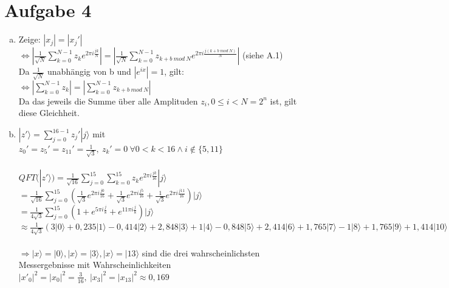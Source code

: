 \documentclass[a4paper]{scrartcl}
\begin{document}
\newpage
\section*{Aufgabe 4}
\begin{enumerate}[a)]
\item Zeige: $|x_j|=|x_j'|$\\
$\Leftrightarrow |\frac{1}{\sqrt{N}}\sum_{k=0}^{N-1}z_k e^{2\pi i \frac{jk}{N}}| = |\frac{1}{\sqrt{N}}\sum_{k=0}^{N-1}z_{k+b~mod~N} e^{2\pi i \frac{j(k+b~mod~N)}{N}}|$ (siehe A.1)\\
Da $\frac{1}{\sqrt{N}}$ unabhängig von b und $|e^{ix}|=1$, gilt:\\
$\Leftrightarrow |\sum_{k=0}^{N-1}z_k| = |\sum_{k=0}^{N-1}z_{k+b~mod~N}|$\\
Da das jeweils die Summe über alle Amplituden $z_i, 0\leq i < N = 2^n$ ist, gilt diese Gleichheit.

\item $|z'\rangle = \sum_{j=0}^{16-1} z_j' |j\rangle$ mit $z_0'=z_5'=z_{11}'=\frac{1}{\sqrt{3}},~z_k'=0~\forall 0<k<16 \wedge i\notin \{5,11\}$\\\\
$QFT(|z'\rangle) =\frac{1}{\sqrt{16}}\sum_{j=0}^{15}\sum_{k=0}^{15}z_k e^{2\pi i \frac{jk}{16}} |j\rangle$\\
$=\frac{1}{\sqrt{16}}\sum_{j=0}^{15} (\frac{1}{\sqrt{3}} e^{2\pi i \frac{j 0}{16}} + \frac{1}{\sqrt{3}} e^{2\pi i \frac{j 5}{16}} + \frac{1}{\sqrt{3}} e^{2\pi i \frac{j 11}{16}}) |j\rangle$\\
$=\frac{1}{4\sqrt{3}}\sum_{j=0}^{15} (1 + e^{5\pi i \frac{j}{8}} + e^{11\pi i \frac{j}{8}}) |j\rangle$\\
$\approx \frac{1}{4\sqrt{3}} (3 |0\rangle + 0,235 |1\rangle - 0,414 |2\rangle + 2,848|3\rangle + 1|4\rangle - 0,848|5\rangle + 2,414|6\rangle + 1,765|7\rangle - 1|8\rangle + 1,765|9\rangle + 1,414|10\rangle - 0,848|11\rangle + 1|12\rangle + 2,848|13\rangle - 0,414|14\rangle + 0,235|15\rangle )$\\\\
$\Rightarrow |x\rangle=|0\rangle, |x\rangle=|3\rangle, |x\rangle=|13\rangle$ sind die drei wahrscheinlichsten Messergebnisse mit Wahrscheinlichkeiten $|x'_0|^2=|x_0|^2=\frac{3}{16},~|x_3|^2 = |x_{13}|^2\approx 0,169$

\end{enumerate}
\end{document}
